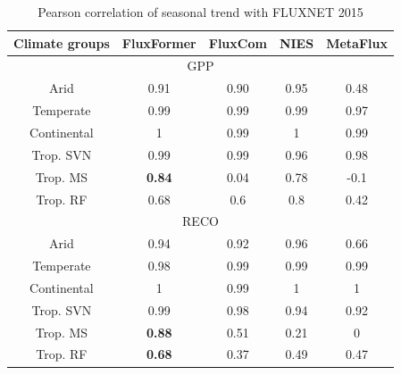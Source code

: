 \begin{table}[!ht]
    \centering
    \caption{Pearson correlation of seasonal trend with FLUXNET 2015}
    \begin{tabular}{ccccc}
        \hline
        Climate groups & FluxFormer & FluxCom & NIES & MetaFlux  \\ \hline
        \multicolumn{5}{c}{GPP}   \\ \hline 
        Arid & 0.91 & 0.90 & 0.95 & 0.48  \\ \hline 
        Temperate & 0.99 & 0.99 & 0.99 & 0.97  \\ \hline 
        Continental & 1 & 0.99 & 1 & 0.99  \\ \hline 
        Trop. SVN & 0.99 & 0.99 & 0.96 & 0.98  \\ \hline 
        Trop. MS & \textbf{0.84} & 0.04 & 0.78 & -0.1  \\ \hline 
        Trop. RF & 0.68 & 0.6 & 0.8 & 0.42  \\ \hline 
        \multicolumn{5}{c}{RECO}   \\ \hline 
        Arid & 0.94 & 0.92 & 0.96 & 0.66  \\ \hline 
        Temperate & 0.98 & 0.99 & 0.99 & 0.99  \\ \hline 
        Continental & 1 & 0.99 & 1 & 1  \\ \hline 
        Trop. SVN & 0.99 & 0.98 & 0.94 & 0.92  \\ \hline 
        Trop. MS & \textbf{0.88} & 0.51 & 0.21 & 0  \\ \hline 
        Trop. RF & \textbf{0.68} & 0.37 & 0.49 & 0.47  \\ \hline 
    \end{tabular}
    \label{tab:chap6_seasonr}
\end{table}
